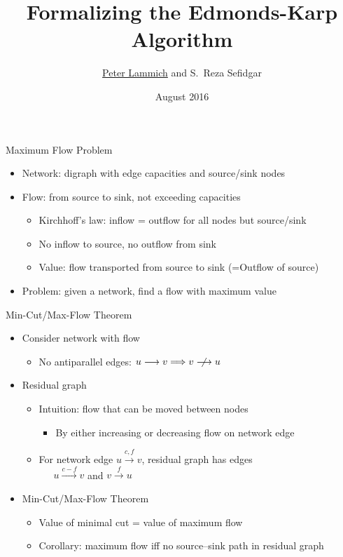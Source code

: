 \documentclass[fleqn]{beamer}
\title{Formalizing the Edmonds-Karp Algorithm}
\author[Peter Lammich]{\underline{Peter Lammich} and S.~Reza Sefidgar}
\institute[TUM] %
{ TU M\"unchen %
}
\date {August 2016}
\newcommand{\edge}[1]{\stackrel{#1}{\longrightarrow}}
\begin{document}
% 

\begin{frame}
  \titlepage
\end{frame}

\begin{frame}{Maximum Flow Problem}
  \begin{itemize}
   \item<+-> Network: digraph with edge capacities and source/sink nodes
   \item<+-> Flow: from source to sink, not exceeding capacities
    \begin{itemize}
     \item Kirchhoff's law: inflow = outflow for all nodes but source/sink
     \item No inflow to source, no outflow from sink
     \item Value: flow transported from source to sink (=Outflow of source)
    \end{itemize}
   \item<+-> Problem: given a network, find a flow with maximum value

  \end{itemize}
\end{frame}
\begin{frame}{Min-Cut/Max-Flow Theorem}
  \begin{itemize}
   \item<+-> Consider network with flow
    \begin{itemize}
     \item No antiparallel edges: $u\edge{} v \implies v\centernot{\edge{}} u$
    \end{itemize}
   \item<+-> Residual graph
    \begin{itemize}
     \item Intuition: flow that can be moved between nodes
      \begin{itemize}
       \item By either increasing or decreasing flow on network edge
      \end{itemize}
     \item For network edge $u\edge{c,f} v$, residual graph has edges\\[1em]
      ~~~$u\edge{c-f} v$ and $v\edge{f} u$\\[1em]
    \end{itemize}
   \item<+-> Min-Cut/Max-Flow Theorem
    \begin{itemize}
     \item Value of minimal cut = value of maximum flow
     \item Corollary: maximum flow iff no source--sink path in residual graph

    \end{itemize}
  \end{itemize}
\end{frame}
\end{document}
